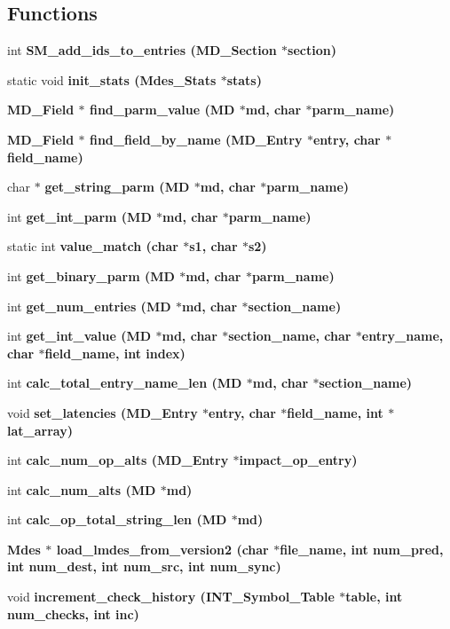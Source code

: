 \subsection*{Functions}
\begin{CompactItemize}
\item 
int \bf{SM\_\-add\_\-ids\_\-to\_\-entries} (\bf{MD\_\-Section} $\ast$section)
\item 
static void \bf{init\_\-stats} (\bf{Mdes\_\-Stats} $\ast$stats)
\item 
\bf{MD\_\-Field} $\ast$ \bf{find\_\-parm\_\-value} (\bf{MD} $\ast$md, char $\ast$parm\_\-name)
\item 
\bf{MD\_\-Field} $\ast$ \bf{find\_\-field\_\-by\_\-name} (\bf{MD\_\-Entry} $\ast$\bf{entry}, char $\ast$field\_\-name)
\item 
char $\ast$ \bf{get\_\-string\_\-parm} (\bf{MD} $\ast$md, char $\ast$parm\_\-name)
\item 
int \bf{get\_\-int\_\-parm} (\bf{MD} $\ast$md, char $\ast$parm\_\-name)
\item 
static int \bf{value\_\-match} (char $\ast$s1, char $\ast$s2)
\item 
int \bf{get\_\-binary\_\-parm} (\bf{MD} $\ast$md, char $\ast$parm\_\-name)
\item 
int \bf{get\_\-num\_\-entries} (\bf{MD} $\ast$md, char $\ast$section\_\-name)
\item 
int \bf{get\_\-int\_\-value} (\bf{MD} $\ast$md, char $\ast$section\_\-name, char $\ast$entry\_\-name, char $\ast$field\_\-name, int index)
\item 
int \bf{calc\_\-total\_\-entry\_\-name\_\-len} (\bf{MD} $\ast$md, char $\ast$section\_\-name)
\item 
void \bf{set\_\-latencies} (\bf{MD\_\-Entry} $\ast$\bf{entry}, char $\ast$field\_\-name, int $\ast$lat\_\-array)
\item 
int \bf{calc\_\-num\_\-op\_\-alts} (\bf{MD\_\-Entry} $\ast$impact\_\-op\_\-entry)
\item 
int \bf{calc\_\-num\_\-alts} (\bf{MD} $\ast$md)
\item 
int \bf{calc\_\-op\_\-total\_\-string\_\-len} (\bf{MD} $\ast$md)
\item 
\bf{Mdes} $\ast$ \bf{load\_\-lmdes\_\-from\_\-version2} (char $\ast$file\_\-name, int num\_\-pred, int num\_\-dest, int num\_\-src, int num\_\-sync)
\item 
void \bf{increment\_\-check\_\-history} (\bf{INT\_\-Symbol\_\-Table} $\ast$table, int num\_\-checks, int inc)
\item 

\end{CompactItemize}

